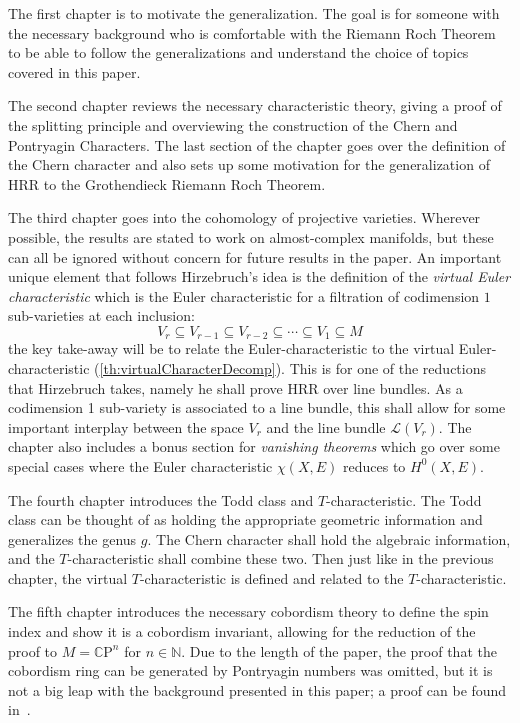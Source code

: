 \documentclass{book}
\newcommand{\N}{{\mathbb{N}}}
\newcommand{\CL}{{\mathcal{L}}}
\newcommand{\CP}{{\mathbb{C}\mathrm{P}}}
\newcommand{\sse}{\subseteq}
\begin{document}
The first chapter is to motivate the generalization. The goal is for someone with the necessary background
who is comfortable with the Riemann Roch Theorem to be able to follow the generalizations and understand the
choice of topics covered in this paper.

The second chapter reviews the necessary characteristic theory, giving a proof of the splitting
principle and overviewing the construction of the Chern and Pontryagin Characters. The last section of the
chapter goes over the definition of the Chern character and also sets up some motivation for the
generalization of HRR to the Grothendieck Riemann Roch Theorem.

The third chapter goes into the cohomology of projective varieties. Wherever possible, the results are stated
to work on almost-complex manifolds, but these can all be ignored without concern for future results in the
paper. An important unique element that follows Hirzebruch's idea is the definition of the \emph{virtual Euler
characteristic} which is the Euler characteristic for a filtration of codimension $1$ sub-varieties at each
inclusion:
\[
  V_r \sse V_{r-1} \sse V_{r-2} \sse \cdots \sse V_1 \sse M
\]
the key take-away will be to relate the Euler-characteristic to the virtual Euler-characteristic
(\cref{th:virtualCharacterDecomp}). This is for one of the reductions that Hirzebruch takes, namely he shall
prove HRR over line bundles. As a codimension 1 sub-variety is associated to a line bundle, this shall allow
for some important interplay between the space $V_r$ and the line bundle $\CL(V_r)$. The chapter also includes
a bonus section for \emph{vanishing theorems} which go over some special cases where the Euler characteristic
$\chi(X,E)$ reduces to $H^0(X, E)$.

The fourth chapter introduces the Todd class and $T$-characteristic. The Todd class can be thought of as holding
the appropriate geometric information and generalizes the genus $g$. The Chern character shall hold the
algebraic information, and the $T$-characteristic shall combine these two. Then just like in the
previous chapter, the virtual $T$-characteristic is defined and related to the $T$-characteristic.

The fifth chapter introduces the necessary cobordism theory to define the spin index and show it is a cobordism
invariant, allowing for the reduction of the proof to $M = \CP^n$ for $n \in\N$. Due to the length of the
paper, the proof that the cobordism ring can be generated by Pontryagin numbers was omitted, but it is not
a big leap with the background presented in this paper; a proof can be found
in~\cite{hirzebruchTopologicalMethodsAlgebraic1995}.
\end{document}
